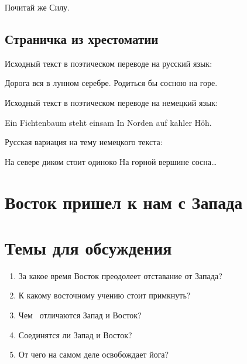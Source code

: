 Почитай же Силу.

\subsection[Страничка из хрестоматии]{Страничка из хрестоматии}
Исходный текст в поэтическом переводе на русский язык:

Дорога вся в лунном серебре.\newline
Родиться бы сосною на горе.

Исходный текст в поэтическом переводе на немецкий язык:

Ein Fichtenbaum steht einsam\newline
In Norden auf kahler Höh.

Русская вариация на тему немецкого текста:

На севере диком стоит одиноко\newline
На горной вершине сосна…

\section[Восток пришел к нам с Запада]{Восток пришел к нам с Запада}
\section[Темы для обсуждения]{Темы для обсуждения}
\begin{enumerate}
\item За какое время Восток преодолеет отставание от Запада?
\item К какому восточному учению стоит примкнуть?
\item Чем \ отличаются Запад и Восток?
\item Соединятся ли Запад и Восток?
\item От чего на самом деле освобождает йога?
\end{enumerate}
%

